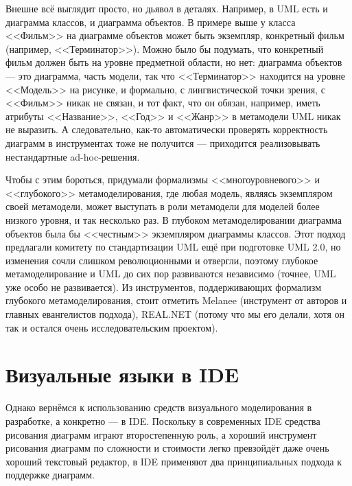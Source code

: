 \documentclass{text-style}
\begin{document}

Внешне всё выглядит просто, но дьявол в деталях. Например, в UML есть и диаграмма классов, и диаграмма объектов. В примере выше у класса <<Фильм>> на диаграмме объектов может быть экземпляр, конкретный фильм (например, <<Терминатор>>). Можно было бы подумать, что конкретный фильм должен быть на уровне предметной области, но нет: диаграмма объектов --- это диаграмма, часть модели, так что <<Терминатор>> находится на уровне <<Модель>> на рисунке, и формально, с лингвистической точки зрения, с <<Фильм>> никак не связан, и тот факт, что он обязан, например, иметь атрибуты <<Название>>, <<Год>> и <<Жанр>> в метамодели UML никак не выразить. А следовательно, как-то автоматически проверять корректность диаграмм в инструментах тоже не получится --- приходится реализовывать нестандартные ad-hoc-решения.

Чтобы с этим бороться, придумали формализмы <<многоуровневого>> и <<глубокого>> метамоделирования, где любая модель, являясь экземпляром своей метамодели, может выступать в роли метамодели для моделей более низкого уровня, и так несколько раз. В глубоком метамоделировании диаграмма объектов была бы <<честным>> экземпляром диаграммы классов. Этот подход предлагали комитету по стандартизации UML ещё при подготовке UML 2.0, но изменения сочли слишком революционными и отвергли, поэтому глубокое метамоделирование и UML до сих пор развиваются независимо (точнее, UML уже особо не развивается). Из инструментов, поддерживающих формализм глубокого метамоделирования, стоит отметить Melanee (инструмент от авторов и главных евангелистов подхода), REAL.NET (потому что мы его делали, хотя он так и остался очень исследовательским проектом).


\section{Визуальные языки в IDE}

Однако вернёмся к использованию средств визуального моделирования в разработке, а конкретно --- в IDE. Поскольку в современных IDE средства рисования диаграмм играют второстепенную роль, а хороший инструмент рисования диаграмм по сложности и стоимости легко превзойдёт даже очень хороший текстовый редактор, в IDE применяют два принципиальных подхода к поддержке диаграмм.
\end{document}
